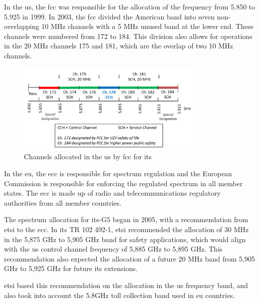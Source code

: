 In the \gls{us}, the \gls{fcc} was responsible for the allocation of the frequency from 5.850 to 5.925 in 1999. In 2003, the \gls{fcc} divided the American band into seven non-overlapping 10 MHz channels with a 5 MHz unused band at the lower end. These channels were numbered from 172 to 184. This division also allows for operations in the 20 MHz channels 175 and 181, which are the overlap of two 10 MHz channels\cite{harri_multi-channel_2015}.

\begin{figure}[htbp]
    \centering
    \includegraphics[width=0.8\textwidth]{Chapters/Figures/VANETs/WAVE_channels.png}
   	\caption{Channels allocated in the \gls{us} by \gls{fcc} for \gls{its}~\cite{harri_multi-channel_2015}}
   	\label{fig:WAVE_channels}
\end{figure}

In the \gls{eu}, the \gls{ecc} is responsible for spectrum regulation and the European Commission is responsible for enforcing the regulated spectrum in all member states. The \gls{ecc} is made up of radio and telecommunications regulatory authorities from all member countries\cite{harri_multi-channel_2015}\cite{asselin-miller_study_2016}.

The spectrum allocation for \gls{its}-G5 began in 2005, with a recommendation from \gls{etsi} to the \gls{ecc}. In its TR 102 492-1\cite{etsi_electromagnetic_2005}, \gls{etsi} recommended the allocation of 30 MHz in the 5,875 GHz to 5,905 GHz band for safety applications, which would align with the \gls{us} control channel frequency of 5,885 GHz to 5,895 GHz. This recommendation also expected the allocation of a future 20 MHz band from 5,905 GHz to 5,925 GHz for future \gls{its} extensions\cite{harri_multi-channel_2015}\cite{asselin-miller_study_2016}.

\gls{etsi} based this recommendation on the allocation in the \gls{us} frequency band, and also took into account the 5.8GHz toll collection band used in \gls{eu} countries\cite{harri_multi-channel_2015}\cite{asselin-miller_study_2016}.

